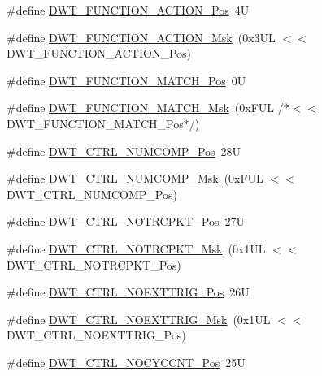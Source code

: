 \begin{DoxyCompactItemize}
\item 
\#define \mbox{\hyperlink{group___c_m_s_i_s___d_w_t_ga00893dd43b824ca5be80e0235a237485}{D\+W\+T\+\_\+\+F\+U\+N\+C\+T\+I\+O\+N\+\_\+\+A\+C\+T\+I\+O\+N\+\_\+\+Pos}}~4U
\item 
\#define \mbox{\hyperlink{group___c_m_s_i_s___d_w_t_ga4d104412bbadbbfbde1c6da0f9b0fc3e}{D\+W\+T\+\_\+\+F\+U\+N\+C\+T\+I\+O\+N\+\_\+\+A\+C\+T\+I\+O\+N\+\_\+\+Msk}}~(0x3\+U\+L $<$$<$ D\+W\+T\+\_\+\+F\+U\+N\+C\+T\+I\+O\+N\+\_\+\+A\+C\+T\+I\+O\+N\+\_\+\+Pos)
\item 
\#define \mbox{\hyperlink{group___c_m_s_i_s___d_w_t_ga4108994a9eb6b2cd8d8289b1b7824fe5}{D\+W\+T\+\_\+\+F\+U\+N\+C\+T\+I\+O\+N\+\_\+\+M\+A\+T\+C\+H\+\_\+\+Pos}}~0U
\item 
\#define \mbox{\hyperlink{group___c_m_s_i_s___d_w_t_gac2fb3e387e405a4b33fc5ba0bea5b21c}{D\+W\+T\+\_\+\+F\+U\+N\+C\+T\+I\+O\+N\+\_\+\+M\+A\+T\+C\+H\+\_\+\+Msk}}~(0x\+F\+U\+L /$\ast$$<$$<$ D\+W\+T\+\_\+\+F\+U\+N\+C\+T\+I\+O\+N\+\_\+\+M\+A\+T\+C\+H\+\_\+\+Pos$\ast$/)
\item 
\#define \mbox{\hyperlink{group___c_m_s_i_s___d_w_t_gaac44b9b7d5391a7ffef129b7f6c84cd7}{D\+W\+T\+\_\+\+C\+T\+R\+L\+\_\+\+N\+U\+M\+C\+O\+M\+P\+\_\+\+Pos}}~28U
\item 
\#define \mbox{\hyperlink{group___c_m_s_i_s___d_w_t_gaa3d37d68c2ba73f2026265584c2815e7}{D\+W\+T\+\_\+\+C\+T\+R\+L\+\_\+\+N\+U\+M\+C\+O\+M\+P\+\_\+\+Msk}}~(0x\+F\+U\+L $<$$<$ D\+W\+T\+\_\+\+C\+T\+R\+L\+\_\+\+N\+U\+M\+C\+O\+M\+P\+\_\+\+Pos)
\item 
\#define \mbox{\hyperlink{group___c_m_s_i_s___d_w_t_gaa82840323a2628e7f4a2b09b74fa73fd}{D\+W\+T\+\_\+\+C\+T\+R\+L\+\_\+\+N\+O\+T\+R\+C\+P\+K\+T\+\_\+\+Pos}}~27U
\item 
\#define \mbox{\hyperlink{group___c_m_s_i_s___d_w_t_ga04d8bb0a065ca38e2e5f13a97e1f7073}{D\+W\+T\+\_\+\+C\+T\+R\+L\+\_\+\+N\+O\+T\+R\+C\+P\+K\+T\+\_\+\+Msk}}~(0x1\+U\+L $<$$<$ D\+W\+T\+\_\+\+C\+T\+R\+L\+\_\+\+N\+O\+T\+R\+C\+P\+K\+T\+\_\+\+Pos)
\item 
\#define \mbox{\hyperlink{group___c_m_s_i_s___d_w_t_gad997b9026715d5609b5a3b144eca42d0}{D\+W\+T\+\_\+\+C\+T\+R\+L\+\_\+\+N\+O\+E\+X\+T\+T\+R\+I\+G\+\_\+\+Pos}}~26U
\item 
\#define \mbox{\hyperlink{group___c_m_s_i_s___d_w_t_gacc7d15edf7a27147c422099ab475953e}{D\+W\+T\+\_\+\+C\+T\+R\+L\+\_\+\+N\+O\+E\+X\+T\+T\+R\+I\+G\+\_\+\+Msk}}~(0x1\+U\+L $<$$<$ D\+W\+T\+\_\+\+C\+T\+R\+L\+\_\+\+N\+O\+E\+X\+T\+T\+R\+I\+G\+\_\+\+Pos)
\item 
\#define \mbox{\hyperlink{group___c_m_s_i_s___d_w_t_ga337f6167d960f57f12aa382ffecce522}{D\+W\+T\+\_\+\+C\+T\+R\+L\+\_\+\+N\+O\+C\+Y\+C\+C\+N\+T\+\_\+\+Pos}}~25U

\end{DoxyCompactItemize}
